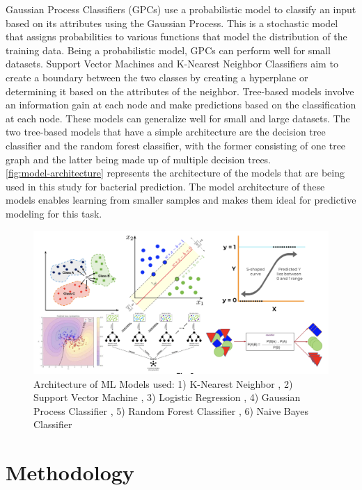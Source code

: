 \noindent Gaussian Process Classifiers (GPCs) use a probabilistic model to classify an input based on its attributes using the Gaussian Process. This is a stochastic model that assigns probabilities to various functions that model the distribution of the training data. \cite{Goertler2019DistillGP}  Being a probabilistic model, GPCs can perform well for small datasets. Support Vector Machines and K-Nearest Neighbor Classifiers aim to create a boundary between the two classes by creating a hyperplane or determining it based on the attributes of the neighbor. \cite{MITSVM,SciDirectKNN} Tree-based models involve an information gain at each node and make predictions based on the classification at each node. These models can generalize well for small and large datasets. The two tree-based models that have a simple architecture are the decision tree classifier and the random forest classifier, with the former consisting of one tree graph and the latter being made up of multiple decision trees. \cite{MediumTreeML} \\ 

\noindent \autoref{fig:model-architecture} represents the architecture of the models that are being used in this study for bacterial prediction. The model architecture of these models enables learning from smaller samples and makes them ideal for predictive modeling for this task. 

\begin{figure}
    \centering
    \includegraphics[width=0.5\linewidth]{Figures/Model_Architecture.png}
    \caption{Architecture of ML Models used: 1) K-Nearest Neighbor \cite{imageknn}, 2) Support Vector Machine \cite{Singh2025_SupervisedLearningCheatSheet}, 3) Logistic Regression \cite{DataLensBlogger2024_ClassificationCheatSheet} , 4) Gaussian Process Classifier \cite{Kulkarni2024_Day10SLA3} , 5) Random Forest Classifier \cite{ranforest} , 6) Naive Bayes Classifier \cite{MLArchive_NaiveBayes2023} }
    \label{fig:model-architecture}
\end{figure}

\section{Methodology} \label{sec:desc}

